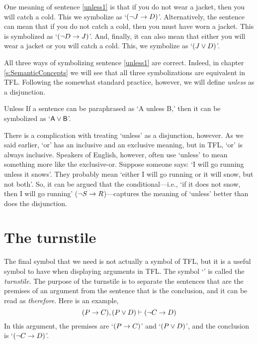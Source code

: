One meaning of sentence \ref{unless1} is that if you do not wear a jacket, then you will catch a cold. This we symbolize as `$({\neg} J \rightarrow D)$'. Alternatively, the sentence can mean that if you do not catch a cold, then you must have worn a jacket. This is symbolized as `$({\neg} D \rightarrow J)$'. And, finally, it can also mean that either you will wear a jacket or you will catch a cold. This, we symbolize as `$(J \vee D)$'.

All three ways of symbolizing sentence \ref{unless1} are correct. Indeed, in chapter \ref{s:SemanticConcepts} we will see that all three symbolizations are equivalent in TFL. Following the somewhat standard practice, however, we will define \textit{unless} as a disjunction.
	
\begin{factboxy}{Unless}
		If a sentence can be paraphrased as `A unless B,' then it can be symbolized as `$\mathsf{A}\vee\mathsf{B}$'.
\end{factboxy}

There is a complication with treating `unless' as a disjunction, however. As we said earlier, `or' has an inclusive and an exclusive meaning, but in TFL, `or' is always inclusive. Speakers of English, however, often use `unless' to mean something more like the exclusive-or. Suppose someone says: `I will go running unless it snows'. They probably mean `either I will go running or it will snow, but not both'. So, it can be argued that the conditional---i.e., `if it does not snow, then I will go running' (${\neg} S \rightarrow R$)---captures the meaning of `unless' better than does the disjunction.


\section{The turnstile}

The final symbol that we need is not actually a symbol of TFL, but it is a useful symbol to have when displaying arguments in TFL. The symbol `\proves' is called the \textit{turnstile}. The purpose of the turnstile is to separate the sentences that are the premises of an argument from the sentence that is the conclusion, and it can be read as \textit{therefore}. Here is an example,
$$(P \rightarrow C), (P \vee D) \vdash ({\neg} C \rightarrow D)$$
In this argument, the premises are `$(P \rightarrow C)$' and `$(P \vee D)$', and the conclusion is `$({\neg} C \rightarrow D)$'.


